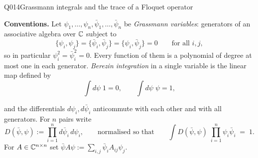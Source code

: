 \begin{entry}{Q014}{Grassmann integrals and the trace of a Floquet operator}


\begin{problem}
\textbf{Conventions.} Let $\psi_1,\dots,\psi_n,\bar\psi_1,\dots,\bar\psi_n$ be
\emph{Grassmann variables}: generators of an associative algebra over $\mathbb{C}$ subject to
\[
  \{\psi_i,\psi_j\}=\{\bar\psi_i,\bar\psi_j\}=\{\psi_i,\bar\psi_j\}=0
  \qquad\text{for all } i,j,
\]
so in particular $\psi_i^{2}=\bar\psi_i^{2}=0$. Every function of them is a polynomial
of degree at most one in each generator. \emph{Berezin integration} in a single variable
is the linear map defined by
\begin{equation}
    \int d\psi\;1=0,
  \qquad
  \int d\psi\;\psi=1,
  \label{grassman identity}
\end{equation}

and the differentials $d\psi_i,d\bar\psi_i$ anticommute with each other and with all
generators. For $n$ pairs write
\[
  D(\bar\psi,\psi):=\prod_{i=1}^{n} d\bar\psi_i\, d\psi_i ,
  \qquad\text{normalised so that}\qquad
  \int D(\bar\psi,\psi)\;\prod_{i=1}^{n}\psi_i\bar\psi_i \;=\;1 .
\]
For $A\in\mathbb{C}^{n\times n}$ set $\bar\psi A\psi:=\sum_{i,j}\bar\psi_i A_{ij}\psi_j$.


\end{problem}
\end{entry}
